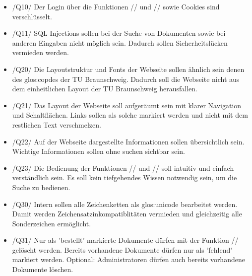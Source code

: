 \begin{itemize}

\item  /Q10/ Der Login über die Funktionen // und // sowie Cookies sind verschlüsselt.
\item  /Q11/ SQL-Injections sollen bei der Suche von Dokumenten sowie bei anderen Eingaben nicht möglich sein. Dadurch sollen Sicherheitslücken vermieden werden.
\item  /Q20/ Die Layoutstruktur und Fonts der Webseite sollen ähnlich sein denen des \Gls{glos:copdes} der TU Braunschweig. Dadurch soll die Webseite nicht aus dem einheitlichen Layout der TU Braunschweig herausfallen.
\item  /Q21/ Das Layout der Webseite soll aufgeräumt sein mit klarer Navigation und Schaltflächen. Links sollen als solche markiert werden und nicht mit dem restlichen Text verschmelzen.
\item  /Q22/ Auf der Webseite dargestellte Informationen sollen übersichtlich sein. Wichtige Informationen sollen ohne suchen sichtbar sein.
\item  /Q23/ Die Bedienung der Funktionen // und // soll intuitiv und einfach verständlich sein. Es soll kein tiefgehendes Wissen notwendig sein, um die Suche zu bedienen.
\item  /Q30/ Intern sollen alle Zeichenketten als \Gls{glos:unicode} bearbeitet werden. Damit werden Zeichensatzinkompatiblitäten vermieden und gleichzeitig alle Sonderzeichen ermöglicht.
\item  /Q31/ Nur als 'bestellt' markierte Dokumente dürfen mit der Funktion // gelöscht werden. Bereits vorhandene Dokumente dürfen nur als 'fehlend' markiert werden. Optional: Administratoren dürfen auch bereits vorhandene Dokumente löschen.

\end{itemize} 